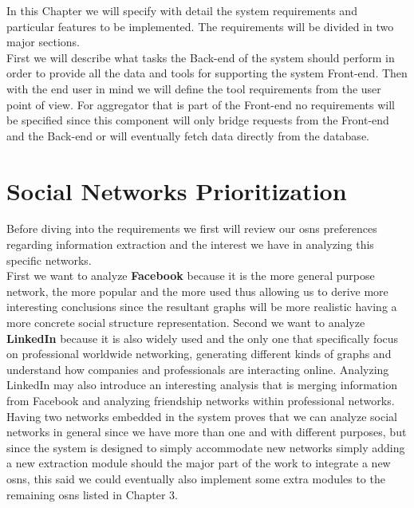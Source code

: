 In this Chapter we will specify with detail the system requirements and particular features to be implemented. The requirements
will be divided in two major sections.\\
\indent First we will describe what tasks the Back-end of the system should perform in order to provide
all the data and tools for supporting the system Front-end. Then with the end user in mind we will define the tool requirements from
the user point of view. For aggregator that is part of the Front-end no requirements will be specified since this component will only bridge
requests from the Front-end and the Back-end or will eventually fetch data directly from the database.\\

\section{Social Networks Prioritization}
Before diving into the requirements we first will review our \glspl{osn} preferences regarding information extraction and the
interest we have in analyzing this specific networks.\\
\indent First we want to analyze \textbf{Facebook} because it is the more general purpose network, the more popular and the more used
thus allowing us to derive more interesting conclusions since the resultant graphs will be more realistic having a more concrete social structure
representation. Second we want to analyze \textbf{LinkedIn} because it is also widely used and the only one that specifically
focus on professional worldwide networking, generating different kinds of graphs and understand how companies and professionals
are interacting online. Analyzing LinkedIn may also introduce an interesting analysis that is merging information from Facebook and
analyzing friendship networks within professional networks.\\
\indent Having two networks embedded in the system proves that we can analyze social networks in general since we have more
than one and with different purposes, but since the system is designed to simply accommodate new networks simply adding
a new extraction module should the major part of the work to integrate a new \glspl{osn}, this said we could eventually
also implement some extra modules to the remaining \glspl{osn} listed in Chapter 3.




